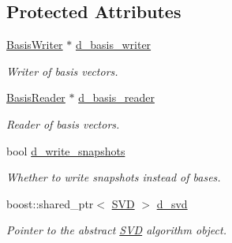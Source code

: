 \subsection*{Protected Attributes}
\begin{DoxyCompactItemize}
\item 
\hypertarget{class_c_a_r_o_m_1_1_basis_generator_a97fb4191bc3e3d905afaf1ba328f9a35}{\hyperlink{class_c_a_r_o_m_1_1_basis_writer}{Basis\-Writer} $\ast$ \hyperlink{class_c_a_r_o_m_1_1_basis_generator_a97fb4191bc3e3d905afaf1ba328f9a35}{d\-\_\-basis\-\_\-writer}}\label{class_c_a_r_o_m_1_1_basis_generator_a97fb4191bc3e3d905afaf1ba328f9a35}

\begin{DoxyCompactList}\small\item\em Writer of basis vectors. \end{DoxyCompactList}\item 
\hypertarget{class_c_a_r_o_m_1_1_basis_generator_a4b40e47a51eba2750b94826a417ee7b0}{\hyperlink{class_c_a_r_o_m_1_1_basis_reader}{Basis\-Reader} $\ast$ \hyperlink{class_c_a_r_o_m_1_1_basis_generator_a4b40e47a51eba2750b94826a417ee7b0}{d\-\_\-basis\-\_\-reader}}\label{class_c_a_r_o_m_1_1_basis_generator_a4b40e47a51eba2750b94826a417ee7b0}

\begin{DoxyCompactList}\small\item\em Reader of basis vectors. \end{DoxyCompactList}\item 
\hypertarget{class_c_a_r_o_m_1_1_basis_generator_a29b41ef680c51c919fe66cea2e1942bc}{bool \hyperlink{class_c_a_r_o_m_1_1_basis_generator_a29b41ef680c51c919fe66cea2e1942bc}{d\-\_\-write\-\_\-snapshots}}\label{class_c_a_r_o_m_1_1_basis_generator_a29b41ef680c51c919fe66cea2e1942bc}

\begin{DoxyCompactList}\small\item\em Whether to write snapshots instead of bases. \end{DoxyCompactList}\item 
\hypertarget{class_c_a_r_o_m_1_1_basis_generator_aa09bd927752edca874108ca09d9bcc7e}{boost\-::shared\-\_\-ptr$<$ \hyperlink{class_c_a_r_o_m_1_1_s_v_d}{S\-V\-D} $>$ \hyperlink{class_c_a_r_o_m_1_1_basis_generator_aa09bd927752edca874108ca09d9bcc7e}{d\-\_\-svd}}\label{class_c_a_r_o_m_1_1_basis_generator_aa09bd927752edca874108ca09d9bcc7e}

\begin{DoxyCompactList}\small\item\em Pointer to the abstract \hyperlink{class_c_a_r_o_m_1_1_s_v_d}{S\-V\-D} algorithm object. \end{DoxyCompactList}\end{DoxyCompactItemize}


